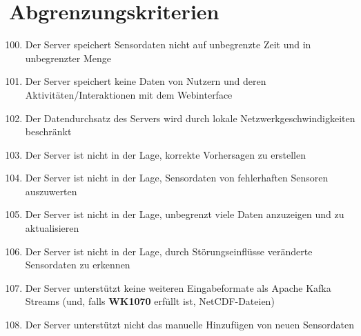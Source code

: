 \section{Abgrenzungskriterien}
\begin{enumerate}[label=\textbf{AK\arabic{enumi}0}]
	\setcounter{enumi}{99}
	\item Der Server speichert Sensordaten nicht auf unbegrenzte Zeit und in unbegrenzter Menge
	\item Der Server speichert keine Daten von Nutzern und deren Aktivitäten/Interaktionen mit dem Webinterface
	\item Der Datendurchsatz des Servers wird durch lokale Netzwerkgeschwindigkeiten beschränkt
	\item Der Server ist nicht in der Lage, korrekte Vorhersagen zu erstellen
	\item Der Server ist nicht in der Lage, Sensordaten von fehlerhaften Sensoren auszuwerten
	\item Der Server ist nicht in der Lage, unbegrenzt viele Daten anzuzeigen und zu aktualisieren
	\item Der Server ist nicht in der Lage, durch Störungseinflüsse veränderte Sensordaten zu erkennen
	\item Der Server unterstützt keine weiteren Eingabeformate als Apache Kafka Streams (und, falls \textbf{WK1070} erfüllt ist, NetCDF-Dateien)
	\item Der Server unterstützt nicht das manuelle Hinzufügen von neuen Sensordaten
\end{enumerate}